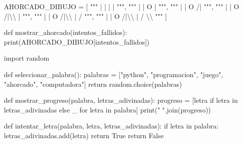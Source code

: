 \documentclass[
  a4paper,
  DIV=11,
  numbers=noendperiod,
  onepage,
  openany]{scrreprt}
\newenvironment{Shaded}{\begin{snugshade}}{\end{snugshade}}
\newcommand{\BuiltInTok}[1]{\textcolor[rgb]{0.00,0.23,0.31}{#1}}
\newcommand{\CharTok}[1]{\textcolor[rgb]{0.13,0.47,0.30}{#1}}
\newcommand{\ControlFlowTok}[1]{\textcolor[rgb]{0.00,0.23,0.31}{#1}}
\newcommand{\ImportTok}[1]{\textcolor[rgb]{0.00,0.46,0.62}{#1}}
\newcommand{\KeywordTok}[1]{\textcolor[rgb]{0.00,0.23,0.31}{#1}}
\newcommand{\NormalTok}[1]{\textcolor[rgb]{0.00,0.23,0.31}{#1}}
\newcommand{\OperatorTok}[1]{\textcolor[rgb]{0.37,0.37,0.37}{#1}}
\newcommand{\StringTok}[1]{\textcolor[rgb]{0.13,0.47,0.30}{#1}}
\newcommand{\VariableTok}[1]{\textcolor[rgb]{0.07,0.07,0.07}{#1}}
\begin{document}
\begin{Shaded}
\begin{Highlighting}[]
\NormalTok{AHORCADO\_DIBUJO }\OperatorTok{=}\NormalTok{ [}
    \StringTok{"""}
\StringTok{       |}
\StringTok{       |}
\StringTok{       |}
\StringTok{       |}
\StringTok{    """}\NormalTok{,}
    \StringTok{"""}
\StringTok{       |}
\StringTok{       |}
\StringTok{       O}
\StringTok{       |}
\StringTok{    """}\NormalTok{,}
    \StringTok{"""}
\StringTok{       |}
\StringTok{       |}
\StringTok{       O}
\StringTok{      /|}
\StringTok{    """}\NormalTok{,}
    \StringTok{"""}
\StringTok{       |}
\StringTok{       |}
\StringTok{       O}
\StringTok{      /|}\CharTok{\textbackslash{}\textbackslash{}}
\StringTok{       |}
\StringTok{    """}\NormalTok{,}
    \StringTok{"""}
\StringTok{       |}
\StringTok{       |}
\StringTok{       O}
\StringTok{      /|}\CharTok{\textbackslash{}\textbackslash{}}
\StringTok{       |}
\StringTok{      /}
\StringTok{    """}\NormalTok{,}
    \StringTok{"""}
\StringTok{       |}
\StringTok{       |}
\StringTok{       O}
\StringTok{      /|}\CharTok{\textbackslash{}\textbackslash{}}
\StringTok{       |}
\StringTok{      / }\CharTok{\textbackslash{}\textbackslash{}}
\StringTok{    """}
\NormalTok{]}

\KeywordTok{def}\NormalTok{ mostrar\_ahorcado(intentos\_fallidos):}
    \BuiltInTok{print}\NormalTok{(AHORCADO\_DIBUJO[intentos\_fallidos])}

\ImportTok{import}\NormalTok{ random}

\KeywordTok{def}\NormalTok{ seleccionar\_palabra():}
\NormalTok{    palabras }\OperatorTok{=}\NormalTok{ [}\StringTok{"python"}\NormalTok{, }\StringTok{"programacion"}\NormalTok{, }\StringTok{"juego"}\NormalTok{, }\StringTok{"ahorcado"}\NormalTok{, }\StringTok{"computadora"}\NormalTok{]}
    \ControlFlowTok{return}\NormalTok{ random.choice(palabras)}

\KeywordTok{def}\NormalTok{ mostrar\_progreso(palabra, letras\_adivinadas):}
\NormalTok{    progreso }\OperatorTok{=}\NormalTok{ [letra }\ControlFlowTok{if}\NormalTok{ letra }\KeywordTok{in}\NormalTok{ letras\_adivinadas }\ControlFlowTok{else} \StringTok{\textquotesingle{}\_\textquotesingle{}} \ControlFlowTok{for}\NormalTok{ letra }\KeywordTok{in}\NormalTok{ palabra]}
    \BuiltInTok{print}\NormalTok{(}\StringTok{" "}\NormalTok{.join(progreso))}

\KeywordTok{def}\NormalTok{ intentar\_letra(palabra, letra, letras\_adivinadas):}
    \ControlFlowTok{if}\NormalTok{ letra }\KeywordTok{in}\NormalTok{ palabra:}
\NormalTok{        letras\_adivinadas.add(letra)}
        \ControlFlowTok{return} \VariableTok{True}
    \ControlFlowTok{return} \VariableTok{False}


\end{Highlighting}
\end{Shaded}
\end{document}
